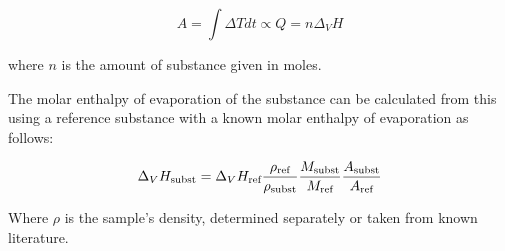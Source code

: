 {\begin{equation} \label{eq:6.15} %
    A = \int \Delta T dt \propto Q = n \Delta_VH
\end{equation}

where $n$ is the amount of substance given in moles.

The molar enthalpy of evaporation of the substance can be calculated from this using a reference substance with a known molar enthalpy of evaporation as follows:

\begin{equation} \label{eq:6.18} %
    \Delta_VH_{\text{subst}} = \Delta_VH_{\text{ref}} {\rho_{\text{ref}} \over \rho_{\text{subst}}} {M_{\text{subst}} \over M_{\text{ref}}} {A_{\text{subst}} \over A_{\text{ref}}}
\end{equation}

Where $\rho$ is the sample’s density, determined separately or taken from known literature.


}